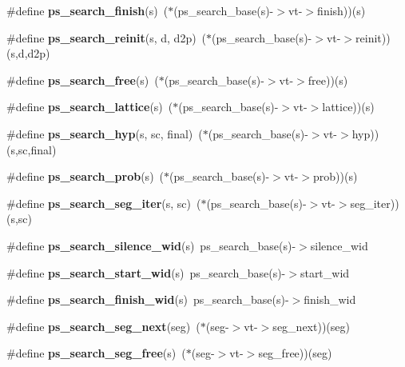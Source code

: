 \begin{DoxyCompactItemize}
\item 
\mbox{\label{pocketsphinx__internal_8h_a52d4cf988efa2211c86a2168de346032}} 
\#define {\bfseries ps\+\_\+search\+\_\+finish}(s)~($\ast$(ps\+\_\+search\+\_\+base(s)-\/$>$vt-\/$>$finish))(s)
\item 
\mbox{\label{pocketsphinx__internal_8h_a071483ece6369091cc50334f5be1124b}} 
\#define {\bfseries ps\+\_\+search\+\_\+reinit}(s,  d,  d2p)~($\ast$(ps\+\_\+search\+\_\+base(s)-\/$>$vt-\/$>$reinit))(s,d,d2p)
\item 
\mbox{\label{pocketsphinx__internal_8h_ac5475853d99524bb4c933c42df58118b}} 
\#define {\bfseries ps\+\_\+search\+\_\+free}(s)~($\ast$(ps\+\_\+search\+\_\+base(s)-\/$>$vt-\/$>$free))(s)
\item 
\mbox{\label{pocketsphinx__internal_8h_ac821fb65e0c2ef778a4b8b49ecf30e11}} 
\#define {\bfseries ps\+\_\+search\+\_\+lattice}(s)~($\ast$(ps\+\_\+search\+\_\+base(s)-\/$>$vt-\/$>$lattice))(s)
\item 
\mbox{\label{pocketsphinx__internal_8h_a61247136ccf60cf65c19ecc9efebcb73}} 
\#define {\bfseries ps\+\_\+search\+\_\+hyp}(s,  sc,  final)~($\ast$(ps\+\_\+search\+\_\+base(s)-\/$>$vt-\/$>$hyp))(s,sc,final)
\item 
\mbox{\label{pocketsphinx__internal_8h_a3fb9e1a2036effd2f15cd088140c750f}} 
\#define {\bfseries ps\+\_\+search\+\_\+prob}(s)~($\ast$(ps\+\_\+search\+\_\+base(s)-\/$>$vt-\/$>$prob))(s)
\item 
\mbox{\label{pocketsphinx__internal_8h_a6478039ec1ab5948ff19123c4464a5a4}} 
\#define {\bfseries ps\+\_\+search\+\_\+seg\+\_\+iter}(s,  sc)~($\ast$(ps\+\_\+search\+\_\+base(s)-\/$>$vt-\/$>$seg\+\_\+iter))(s,sc)
\item 
\mbox{\label{pocketsphinx__internal_8h_aab989bd93fe7abcc165bc92d6ccc1bac}} 
\#define {\bfseries ps\+\_\+search\+\_\+silence\+\_\+wid}(s)~ps\+\_\+search\+\_\+base(s)-\/$>$silence\+\_\+wid
\item 
\mbox{\label{pocketsphinx__internal_8h_a6dc7da2c1bc3bfb15d5fbe3618a4e3d4}} 
\#define {\bfseries ps\+\_\+search\+\_\+start\+\_\+wid}(s)~ps\+\_\+search\+\_\+base(s)-\/$>$start\+\_\+wid
\item 
\mbox{\label{pocketsphinx__internal_8h_aaeee657147579bc652c494989622f6b4}} 
\#define {\bfseries ps\+\_\+search\+\_\+finish\+\_\+wid}(s)~ps\+\_\+search\+\_\+base(s)-\/$>$finish\+\_\+wid
\item 
\mbox{\label{pocketsphinx__internal_8h_ae7c150fad9fc9e8a13e632a1386b8f56}} 
\#define {\bfseries ps\+\_\+search\+\_\+seg\+\_\+next}(seg)~($\ast$(seg-\/$>$vt-\/$>$seg\+\_\+next))(seg)
\item 
\mbox{\label{pocketsphinx__internal_8h_a38f6b225e3eace3793cdae8135b0aaab}} 
\#define {\bfseries ps\+\_\+search\+\_\+seg\+\_\+free}(s)~($\ast$(seg-\/$>$vt-\/$>$seg\+\_\+free))(seg)
\end{DoxyCompactItemize}

